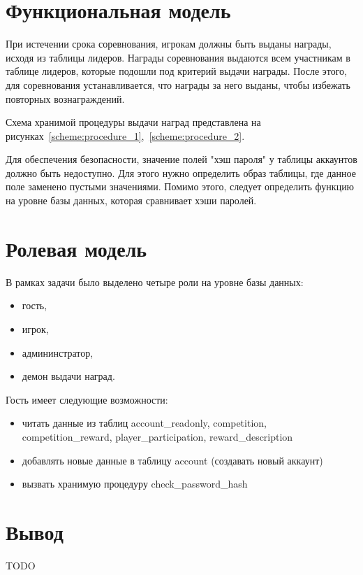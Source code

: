 \section{Функциональная модель}
При истечении срока соревнования, игрокам должны быть выданы награды, исходя из таблицы лидеров. Награды соревнования выдаются всем участникам в таблице лидеров, которые подошли под критерий выдачи награды. После этого, для соревнования устанавливается, что награды за него выданы, чтобы избежать повторных вознаграждений.

Схема хранимой процедуры выдачи наград представлена на рисунках~\ref{scheme:procedure_1},~\ref{scheme:procedure_2}.

Для обеспечения безопасности, значение полей "хэш пароля" у таблицы аккаунтов должно быть недоступно. Для этого нужно определить образ таблицы, где данное поле заменено пустыми значениями. Помимо этого, следует определить функцию на уровне базы данных, которая сравнивает хэши паролей.


\section{Ролевая модель}


В рамках задачи было выделено четыре роли на уровне базы данных:
\begin{itemize}
	\item гость,
	\item игрок,
	\item админинстратор,
	\item демон выдачи наград.
\end{itemize}
Гость имеет следующие возможности:
\begin{itemize}
	\item читать данные из таблиц account\_readonly, competition, competition\_reward, player\_participation, reward\_description
	\item добавлять новые данные в таблицу account (создавать новый аккаунт)
	\item вызвать хранимую процедуру check\_password\_hash
\end{itemize}

\section*{Вывод}

TODO
\clearpage
